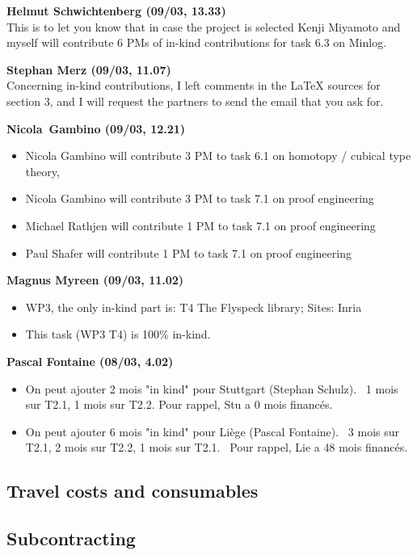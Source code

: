 \textbf{Helmut Schwichtenberg (09/03, 13.33)}\\
This is to let you know that in case the project is selected Kenji Miyamoto and myself will contribute 6 PMs of in-kind contributions for task 6.3 on Minlog.

\textbf{Stephan Merz (09/03, 11.07)}\\
Concerning in-kind contributions, I left comments in the LaTeX sources for section 3, and I will request the partners to send the email that you ask for.

\textbf{Nicola Gambino (09/03, 12.21)}
\begin{itemize}
\item Nicola Gambino will contribute 3 PM to task 6.1 on homotopy / cubical type theory,
\item Nicola Gambino will contribute 3 PM to task 7.1 on proof engineering
\item Michael Rathjen will contribute 1 PM to task 7.1 on proof engineering
\item Paul Shafer will contribute 1 PM to task 7.1 on proof engineering
\end{itemize}

\textbf{Magnus Myreen (09/03, 11.02)}
\begin{itemize}
\item WP3, the only in-kind part is: T4 The Flyspeck library; Sites: Inria
\item This task (WP3 T4) is 100\% in-kind.
\end{itemize}

\textbf{Pascal Fontaine (08/03, 4.02)}
\begin{itemize}
\item On peut ajouter 2 mois "in kind" pour Stuttgart (Stephan Schulz).  1 mois sur T2.1, 1 mois sur T2.2. Pour rappel, Stu a 0 mois financés.
\item On peut ajouter 6 mois "in kind" pour Liège (Pascal Fontaine).  3 mois sur T2.1, 2 mois sur T2.2, 1 mois sur T2.1.  Pour rappel, Lie a 48 mois financés.
\end{itemize}

\subsection{Travel costs and consumables}\label{sec:travel-costs}

\subsection{Subcontracting}\label{sec:subcontracting}

